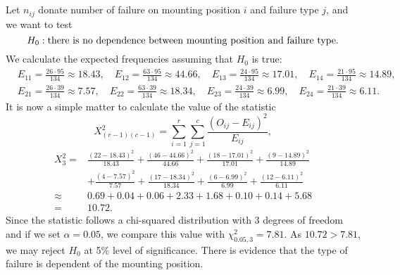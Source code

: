 \documentclass[11pt,a4paper]{article}
\begin{document}
\subsection{}
Let $n_{ij}$ donate number of failure on mounting position $i$ and failure type $j$, and we want to test
$$H_0:{\rm there\ is\ no\ dependence\ between\ mounting\ position\ and\ failure\ type }.$$
We calculate the expected frequencies assuming that $H_0$ is true:
\begin{align*}
&E_{11}=\frac{26\cdot95}{134}\approx18.43,\quad E_{12}=\frac{63\cdot95}{134}\approx44.66,\quad E_{13}=\frac{24\cdot95}{134}\approx17.01,\quad E_{14}=\frac{21\cdot95}{134}\approx14.89,\\
&E_{21}=\frac{26\cdot39}{134}\approx7.57,\quad E_{22}=\frac{63\cdot39}{134}\approx18.34,\quad E_{23}=\frac{24\cdot39}{134}\approx6.99,\quad E_{24}=\frac{21\cdot39}{134}\approx6.11.
\end{align*}
It is now a simple matter to calculate the value of the statistic
$$X^2_{(r-1)(c-1)}=\sum_{i=1}^r\sum_{j=1}^c\frac{(O_{ij}-E_{ij})^2}{E_{ij}},$$
\begin{align*}
X_3^2=&\frac{(22-18.43)^2}{18.43}+\frac{(46-44.66)^2}{44.66}+\frac{(18-17.01)^2}{17.01}+\frac{(9-14.89)^2}{14.89}\\
&+\frac{(4-7.57)^2}{7.57}+\frac{(17-18.34)^2}{18.34}+\frac{(6-6.99)^2}{6.99}+\frac{(12-6.11)^2}{6.11}\\
\approx &0.69+0.04+0.06+2.33+1.68+0.10+0.14+5.68\\
=&10.72.
\end{align*}
Since the statistic follows a chi-squared distribution with 3 degrees of
freedom and if we set $\alpha = 0.05$, we compare this value with $\chi^2_{0.05,3}=7.81$. As $10.72>7.81$, we may reject $H_0$ at 5\% level of significance. There is evidence that the type of failure is dependent of the mounting position.
\end{document}
